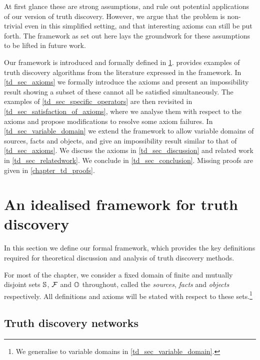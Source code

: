 At first glance these are strong assumptions, and rule out potential
applications of our version of truth discovery. However, we argue that the
problem is non-trivial even in this simplified setting, and that interesting
axioms can still be put forth. The framework as set out here lays the
groundwork for these assumptions to be lifted in future work.

\begin{chapteroutline}
    Our framework is introduced and formally defined in
    \cref{td_sec_framework}.  provides examples
    of truth discovery algorithms from the literature expressed in the
    framework. In \cref{td_sec_axioms} we formally introduce the axioms and
    present an impossibility result showing a subset of these cannot all be
    satisfied simultaneously. The examples of \cref{td_sec_specific_operators}
    are then revisited in \cref{td_sec_satisfaction_of_axioms}, where we
    analyse them with respect to the axioms and propose modifications to
    resolve some axiom failures. In \cref{td_sec_variable_domain} we extend the
    framework to allow variable domains of sources, facts and objects, and give
    an impossibility result similar to that of \cref{td_sec_axioms}. We discuss
    the axioms in \cref{td_sec_discussion} and related work in
    \cref{td_sec_relatedwork}. We conclude in \cref{td_sec_conclusion}. Missing
    proofs are given in \cref{chapter_td_proofs}.
\end{chapteroutline}

\section{An idealised framework for truth discovery}
\label{td_sec_framework}

In this section we define our formal framework, which provides the key
definitions required for theoretical discussion and analysis of truth discovery
methods.

For most of the chapter, we consider a fixed domain of finite and mutually
disjoint sets $\S$, $\F$ and $\O$ throughout, called the \emph{sources},
\emph{facts} and \emph{objects} respectively. All definitions and axioms will
be stated with respect to these sets.\footnote{We generalise to variable
domains in \cref{td_sec_variable_domain}.}

\subsection{Truth discovery networks}

